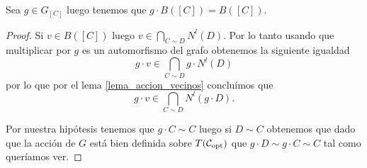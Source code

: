 \documentclass[tesis.tex]{subfiles}
\begin{document}
\begin{lema}\label{lema_g_actua_b(C)}
	Sea $g \in G_{[C]}$ luego tenemos que $g \cdot B([C]) = B([C])$.
\end{lema}
\begin{proof}
	Si $v \in B([C])$ luego $v \in \bigcap_{C \sim D} N^l(D)$.
	Por lo tanto usando que multiplicar por $g$ es un automorfismo del grafo obtenemos la siguiente igualdad
	\[
		g\cdot v \in \bigcap_{C \sim D} g \cdot N^l(D)
	\]
	por lo que por el lema \ref{lema_accion_vecinos} concluímos que 
	\[
		g\cdot v \in \bigcap_{C \sim D}   N^l(g\cdot D).
	\]	
	
	Por nuestra hipótesis tenemos que $g \cdot C \sim C$ luego si $D \sim C$ obtenemos que dado que la acción de $G$ está bien definida sobre $T({\cal C}_{\text{opt}})$ que $g\cdot D \sim g\cdot C \sim C$ tal como queríamos ver.		
	
\end{proof}
\end{document}
